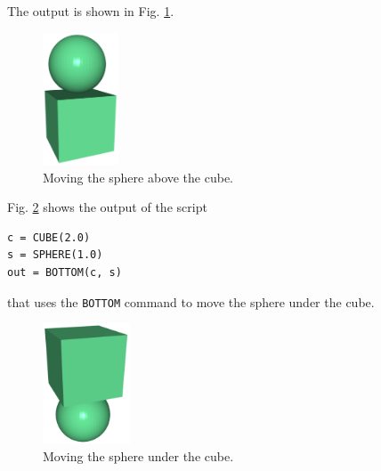 \noindent
The output is shown in Fig. \ref{fig:top-1}.

\begin{figure}[!ht]
\begin{center}
\includegraphics[width=0.2\textwidth]{img/top-1.png}
\end{center}
\vspace{-4mm}
\caption{Moving the sphere above the cube.}
\label{fig:top-1}
\end{figure}
\noindent
Fig. \ref{fig:bottom-1} shows the output of the script\\

\begin{bbox}
\begin{verbatim}
c = CUBE(2.0)
s = SPHERE(1.0)
out = BOTTOM(c, s)
\end{verbatim}
\end{bbox}
\vspace{6mm}

\noindent
that uses the {\tt BOTTOM} command to move the sphere 
under the cube.

\begin{figure}[!ht]
\begin{center}
\includegraphics[width=0.23\textwidth]{img/bottom-1.png}
\end{center}
\vspace{-4mm}
\caption{Moving the sphere under the cube.}
\label{fig:bottom-1}
\end{figure}
\noindent

